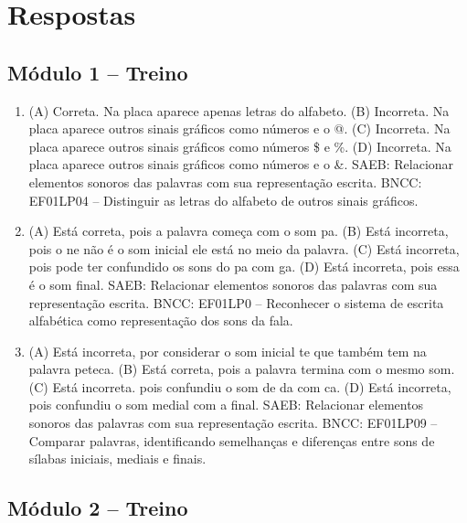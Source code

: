 \chapter{Respostas}
\pagestyle{plain}
\footnotesize

\pagecolor{gray!40}

\section*{Módulo 1 – Treino}

\begin{enumerate}
\item
(A) Correta. Na placa aparece apenas letras do alfabeto.
(B) Incorreta. Na placa aparece outros sinais gráficos como números e o @.
(C) Incorreta. Na placa aparece outros sinais gráficos como números \$ e \%.
(D) Incorreta. Na placa aparece outros sinais gráficos como números e o \&.
SAEB: Relacionar elementos sonoros das palavras com sua representação escrita. 
BNCC: EF01LP04 -- Distinguir as letras do alfabeto de outros sinais gráficos. 

\item
(A) Está correta, pois a palavra começa com o som pa.
(B) Está incorreta, pois o ne não é o som inicial ele está no meio da palavra.
(C) Está incorreta, pois pode ter confundido os sons do pa com ga.
(D) Está incorreta, pois essa é o som final.
SAEB: Relacionar elementos sonoros das palavras com sua representação escrita.
BNCC: EF01LP0 -- Reconhecer o sistema de escrita alfabética como
representação dos sons da fala.

\item
(A) Está incorreta, por considerar o som inicial te que também tem na palavra peteca.
(B) Está correta, pois a palavra termina com o mesmo som.
(C) Está incorreta. pois confundiu o som de da com ca.
(D) Está incorreta, pois confundiu o som medial com a final.
SAEB: Relacionar elementos
sonoros das palavras com sua representação escrita.
BNCC: EF01LP09 -- Comparar palavras, identificando semelhanças e diferenças
entre sons de sílabas iniciais, mediais e finais.
\end{enumerate}

\section*{Módulo 2 – Treino}


